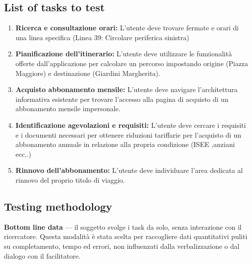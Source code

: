 \documentclass[11pt,a4paper]{article}
\begin{document}
\vspace{0.2cm}

\subsection*{List of tasks to test}
\begin{tcolorbox}[colback=backgroundColor,colframe=borderColor,arc=2mm]
\begin{enumerate}[leftmargin=*,itemsep=4pt]
  \item \textbf{Ricerca e consultazione orari:} L'utente deve
  trovare fermate e orari di una linea specifica (Linea 39: Circolare periferica sinistra)
  \item \textbf{Pianificazione dell'itinerario:} L'utente deve utilizzare le funzionalità offerte dall'applicazione per calcolare un percorso impostando origine (Piazza Maggiore) e destinazione (Giardini Margherita).
  \item \textbf{Acquisto abbonamento mensile:} L'utente
  deve navigare l'architettura informativa esistente per
  trovare l'accesso alla pagina di acquisto di un abbonamento
  mensile impersonale.
  \item \textbf{Identificazione agevolazioni e requisiti:}
  L'utente deve cercare i requisiti  e i documenti necessari per ottenere riduzioni tariffarie per l'acquisto di un
  abbonamento annuale in relazione alla propria condizione (ISEE ,anziani ecc..)
  \item \textbf{Rinnovo dell'abbonamento:} L'utente
  deve individuare l'area dedicata al rinnovo del proprio titolo di viaggio.
\end{enumerate}
\end{tcolorbox}

\vspace{0.2cm}

\subsection*{Testing methodology}
\textbf{Bottom line data} --- il soggetto
svolge i task da solo, senza interazione con il ricercatore.
Questa modalità è stata scelta per raccogliere dati
quantitativi puliti su completamento, tempo ed errori,
non influenzati dalla verbalizzazione o dal dialogo con
il facilitatore.

\vspace{0.2cm}
\end{document}
